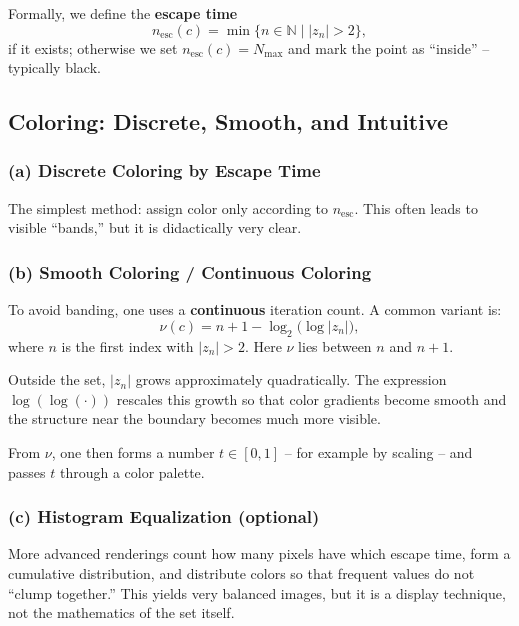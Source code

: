 Formally, we define the \textbf{escape time}
\[
n_\text{esc}(c)=\min\{n\in\mathbb{N}\mid |z_n|>2\},
\]
if it exists; otherwise we set \(n_\text{esc}(c)=N_{\max}\) and mark the point as ``inside'' -- typically black.

\subsection{Coloring: Discrete, Smooth, and Intuitive}

\subsubsection{(a) Discrete Coloring by Escape Time}

The simplest method: assign color only according to \(n_\text{esc}\).
This often leads to visible ``bands,'' but it is didactically very clear.

\subsubsection{(b) Smooth Coloring / Continuous Coloring}

To avoid banding, one uses a \textbf{continuous} iteration count. A common variant is:
\[
\nu(c)=n + 1 - \log_2\!\bigl(\log |z_n|\bigr),
\]
where \(n\) is the first index with \(|z_n|>2\). Here \(\nu\) lies between \(n\) and \(n+1\).

\begin{DidacticBox}
	\label{box:mandelbrot-loglog}
	Outside the set, \(|z_n|\) grows approximately quadratically.
	The expression \(\log(\log(\cdot))\) rescales this growth
	so that color gradients become smooth and the structure near the boundary becomes much more visible.
\end{DidacticBox}

From \(\nu\), one then forms a number \(t\in[0,1]\) -- for example by scaling -- and passes \(t\) through a color palette.

\subsubsection{(c) Histogram Equalization (optional)}

More advanced renderings count how many pixels have which escape time, form a cumulative distribution, and distribute colors so
that frequent values do not ``clump together.'' This yields very balanced images, but it is a display technique, not the mathematics of the set itself.

